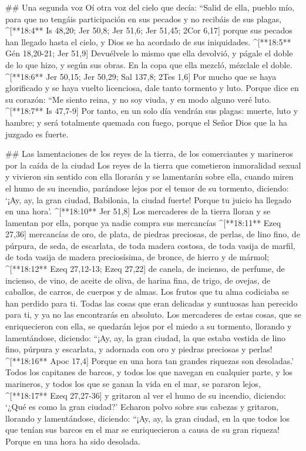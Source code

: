 \begin{paracols}{2}
## Una segunda voz
 Oí otra voz del cielo que decía: “Salid de ella, pueblo mío, para que no tengáis participación en sus pecados y no recibáis de sus plagas, ^[**18:4** Is 48,20; Jer 50,8; Jer 51,6; Jer 51,45; 2Cor 6,17]  porque sus pecados han llegado hasta el cielo, y Dios se ha acordado de sus iniquidades. ^[**18:5** Gén 18,20-21; Jer 51,9]  Devuélvele lo mismo que ella devolvió, y págale el doble de lo que hizo, y según sus obras. En la copa que ella mezcló, mézclale el doble. ^[**18:6** Jer 50,15; Jer 50,29; Sal 137,8; 2Tes 1,6]  Por mucho que se haya glorificado y se haya vuelto licenciosa, dale tanto tormento y luto. Porque dice en su corazón: “Me siento reina, y no soy viuda, y en modo alguno veré luto. ^[**18:7** Is 47,7-9]  Por tanto, en un solo día vendrán sus plagas: muerte, luto y hambre; y será totalmente quemada con fuego, porque el Señor Dios que la ha juzgado es fuerte.

## Las lamentaciones de los reyes de la tierra, de los comerciantes y marineros por la caída de la ciudad
 Los reyes de la tierra que cometieron inmoralidad sexual y vivieron sin sentido con ella llorarán y se lamentarán sobre ella, cuando miren el humo de su incendio,  parándose lejos por el temor de su tormento, diciendo: ‘¡Ay, ay, la gran ciudad, Babilonia, la ciudad fuerte! Porque tu juicio ha llegado en una hora’. ^[**18:10** Jer 51,8]  Los mercaderes de la tierra lloran y se lamentan por ella, porque ya nadie compra sus mercancías ^[**18:11** Ezeq 27,36]  mercancías de oro, de plata, de piedras preciosas, de perlas, de lino fino, de púrpura, de seda, de escarlata, de toda madera costosa, de toda vasija de marfil, de toda vasija de madera preciosísima, de bronce, de hierro y de mármol; ^[**18:12** Ezeq 27,12-13; Ezeq 27,22]  de canela, de incienso, de perfume, de incienso, de vino, de aceite de oliva, de harina fina, de trigo, de ovejas, de caballos, de carros, de cuerpos y de almas.  Los frutos que tu alma codiciaba se han perdido para ti. Todas las cosas que eran delicadas y suntuosas han perecido para ti, y ya no las encontrarás en absoluto.  Los mercaderes de estas cosas, que se enriquecieron con ella, se quedarán lejos por el miedo a su tormento, llorando y lamentándose,  diciendo: “¡Ay, ay, la gran ciudad, la que estaba vestida de lino fino, púrpura y escarlata, y adornada con oro y piedras preciosas y perlas! ^[**18:16** Apoc 17,4]  Porque en una hora tan grandes riquezas son desoladas.’ Todos los capitanes de barcos, y todos los que navegan en cualquier parte, y los marineros, y todos los que se ganan la vida en el mar, se pararon lejos, ^[**18:17** Ezeq 27,27-36]  y gritaron al ver el humo de su incendio, diciendo: ‘¿Qué es como la gran ciudad?’  Echaron polvo sobre sus cabezas y gritaron, llorando y lamentándose, diciendo: “¡Ay, ay, la gran ciudad, en la que todos los que tenían sus barcos en el mar se enriquecieron a causa de su gran riqueza! Porque en una hora ha sido desolada.


\end{paracols}
